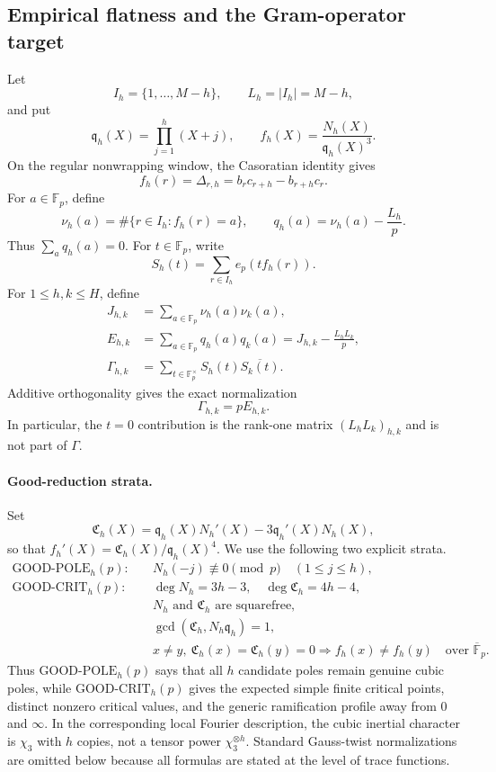 \subsection{Empirical flatness and the Gram-operator target}
\label{gram-subsection}

Let
\[
 I_h=\{1,\ldots,M-h\},\qquad L_h=|I_h|=M-h,
\]
and put
\[
 \mathfrak q_h(X)=\prod_{j=1}^h(X+j),\qquad
 f_h(X)=\frac{N_h(X)}{\mathfrak q_h(X)^3}.
\]
On the regular nonwrapping window, the Casoratian identity gives
\[
 f_h(r)=\Delta_{r,h}
 =b_rc_{r+h}-b_{r+h}c_r.
\]
For $a\in\mathbb F_p$, define
\[
 \nu_h(a)=\#\{r\in I_h:f_h(r)=a\},\qquad
 q_h(a)=\nu_h(a)-\frac{L_h}{p}.
\]
Thus $\sum_aq_h(a)=0$.  For $t\in\mathbb F_p$, write
\[
 S_h(t)=\sum_{r\in I_h}e_p(tf_h(r)).
\]
For $1\le h,k\le H$, define
\begin{align}
 J_{h,k}
 &=\sum_{a\in\mathbb F_p}\nu_h(a)\nu_k(a),
 \label{gram-J-def}\\
 E_{h,k}
 &=\sum_{a\in\mathbb F_p}q_h(a)q_k(a)
 =J_{h,k}-\frac{L_hL_k}{p},
 \label{gram-E-def}\\
 \Gamma_{h,k}
 &=\sum_{t\in\mathbb F_p^\times}
   S_h(t)\overline{S_k(t)}.
 \label{gram-Gamma-def}
\end{align}
Additive orthogonality gives the exact normalization
\begin{equation}
 \boxed{\Gamma_{h,k}=pE_{h,k}.}
 \label{gram-fourier-normalization}
\end{equation}
In particular, the $t=0$ contribution is the rank-one matrix
$(L_hL_k)_{h,k}$ and is not part of $\Gamma$.

\paragraph{Good-reduction strata.}
Set
\[
 \mathfrak C_h(X)
 =\mathfrak q_h(X)N_h'(X)-3\mathfrak q_h'(X)N_h(X),
\]
so that $f_h'(X)=\mathfrak C_h(X)/\mathfrak q_h(X)^4$.
We use the following two explicit strata.
\begin{align*}
 \mathrm{GOOD\mbox{-}POLE}_h(p):\quad
 &N_h(-j)\not\equiv0\pmod p
 \quad(1\le j\le h),\\
 \mathrm{GOOD\mbox{-}CRIT}_h(p):\quad
 &\deg N_h=3h-3,
 \quad \deg\mathfrak C_h=4h-4,\\
 &N_h\text{ and }\mathfrak C_h\text{ are squarefree},\\
 &\gcd(\mathfrak C_h,N_h\mathfrak q_h)=1,\\
 &x\ne y,\ \mathfrak C_h(x)=\mathfrak C_h(y)=0
 \Longrightarrow f_h(x)\ne f_h(y)
 \quad\text{over }\overline{\mathbb F}_p.
\end{align*}
Thus $\mathrm{GOOD\mbox{-}POLE}_h(p)$ says that all $h$ candidate
poles remain genuine cubic poles, while
$\mathrm{GOOD\mbox{-}CRIT}_h(p)$ gives the expected simple finite
critical points, distinct nonzero critical values, and the generic
ramification profile away from $0$ and $\infty$.
In the corresponding local Fourier description, the cubic inertial
character is $\chi_3$ with $h$ copies, not a tensor power
$\chi_3^{\otimes h}$.  Standard Gauss-twist normalizations are omitted
below because all formulas are stated at the level of trace functions.

